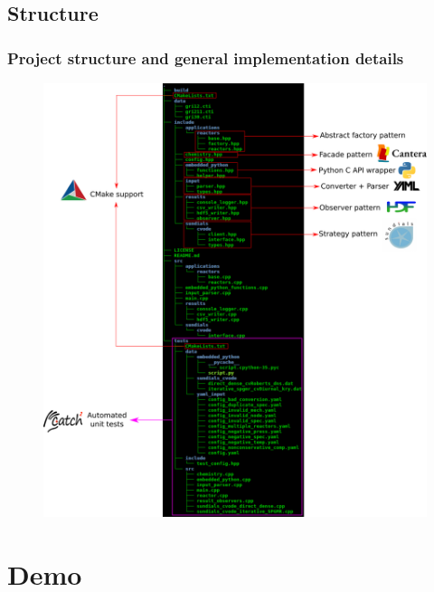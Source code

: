 \documentclass{beamer}
\begin{document}
\subsection{Structure}
\begin{frame}
\frametitle{Project structure and general implementation details}
\vskip-0.35cm
\begin{figure}
  \centering
  \includegraphics[width=0.63\linewidth]{figures/svg/project_tree.png}
\end{figure}
\end{frame}

\section{Demo}
\end{document}
